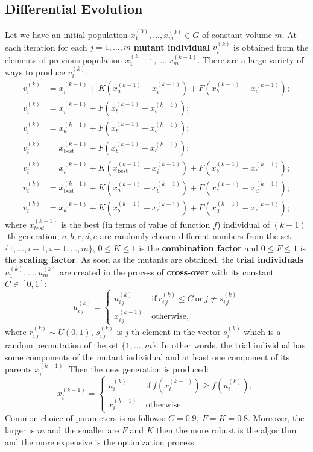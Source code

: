 \documentclass[12pt, bachelor, substylefile = algo_title.rtx]{disser}
\theoremstyle{definition}
\begin{document}
\subsection{Differential Evolution}
Let we have an initial population $x^{(0)}_1, \dots, x^{(0)}_m \in G$ of constant volume $m$. At each iteration for each $j = 1, \dots, m$ \textbf{mutant individual} $v^{(k)}_i$ is obtained from the elements of previous population $x^{(k-1)}_1, \dots, x^{(k-1)}_m$. There are a large variety of ways to produce $v^{(k)}_i$:
\begin{align}
v^{(k)}_i & = x^{(k-1)}_i + K (x^{(k-1)}_a - x^{(k-1)}_i) + F(x^{(k-1)}_b - x^{(k-1)}_c);\\
v^{(k)}_i & = x^{(k-1)}_i + F(x^{(k-1)}_b - x^{(k-1)}_c);\\
v^{(k)}_i & = x^{(k-1)}_a + F(x^{(k-1)}_b - x^{(k-1)}_c);\\
v^{(k)}_i & = x^{(k-1)}_{\text{best}} + F(x^{(k-1)}_b - x^{(k-1)}_c);\\
v^{(k)}_i & = x^{(k-1)}_i + K (x^{(k-1)}_{\text{best}} - x^{(k-1)}_i) + F(x^{(k-1)}_b - x^{(k-1)}_c);\\
v^{(k)}_i & = x^{(k-1)}_{\text{best}} + K (x^{(k-1)}_a - x^{(k-1)}_b) + F(x^{(k-1)}_c - x^{(k-1)}_d);\\
v^{(k)}_i & = x^{(k-1)}_a+ K (x^{(k-1)}_b - x^{(k-1)}_c) + F(x^{(k-1)}_d - x^{(k-1)}_e);
\end{align}
where $x^{(k-1)}_{best}$ is the best (in terms of value of function $f$) individual of $(k-1)$-th generation, $a,b,c,d,e$ are randomly chosen different numbers from the set $\{1,\dots, i-1, i+1, \dots, m\}$, $0\le K \le 1$ is the \textbf{combination factor} and $0 \le F \le 1$ is the \textbf{scaling factor}. As soon as the mutants are obtained, the \textbf{trial individuals} $u^{(k)}_1, \dots, u^{(k)}_m$ are created in the process of \textbf{cross-over} with its constant $C \in [0, 1]$:
\[ u^{(k)}_{i\,j} = 
\begin{cases}
u^{(k)}_{i\,j} &\ \text{if}\ r^{(k)}_{i\,j} \le C\ \text{or}\ j  \ne s^{(k)}_{i\,j}\\
x^{(k-1)}_{i\,j} &\ \text{otherwise},
\end{cases}
 \]
where $r^{(k)}_{i\,j} \sim U(0, 1)$, $s^{(k)}_{i\,j}$ is $j$-th element in the vector $s^{(k)}_{i}$ which is a random permutation of the set $\{1, \dots, m\}$. In other words, the trial individual has some components of the mutant individual and at least one component of its parents $x^{(k-1)}_{i}$. 
Then the new generation is produced:
\[ x^{(k-1)}_{i} = 
\begin{cases}
u^{(k)}_{i} &\ \text{if}\ f( x^{(k-1)}_{i}) \ge  f(u^{(k)}_{i}),\\
x^{(k-1)}_{i} &\ \text{otherwise}.
\end{cases}
 \]
Common choice of parameters is as follows: $C = 0.9,\ F = K = 0.8$. Moreover, the larger is $m$ and the smaller are $F$ and $K$ then the more robust is the algorithm and the more expensive is the optimization process.
\end{document}
